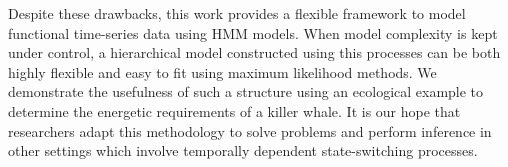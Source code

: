 


Despite these drawbacks, this work provides a flexible framework to model functional time-series data using HMM models. When model complexity is kept under control, a hierarchical model constructed using this processes can be both highly flexible and easy to fit using maximum likelihood methods. We demonstrate the usefulness of such a structure using an ecological example to determine the energetic requirements of a killer whale. It is our hope that researchers adapt this methodology to solve problems and perform inference in other settings which involve temporally dependent state-switching processes.